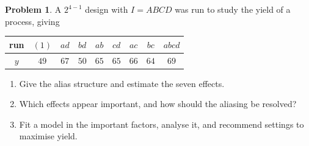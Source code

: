 \documentclass[11pt,a4paper]{article}
\numberwithin{equation}{section}
\theoremstyle{definition}
\newtheorem{problemx}{Problem}[subsection]
\newenvironment{problem}{\begin{problemx}}{\end{problemx}}
\begin{document}
\begin{problem}
A $2^{4-1}$ design with $I = ABCD$ was run to study the yield of a process, giving
\begin{center}
\begin{tabular}{c|cccccccc}
run & $(1)$ & $ad$ & $bd$ & $ab$ & $cd$ & $ac$ & $bc$ & $abcd$ \\
\hline
$y$ & $49$ & $67$ & $50$ & $65$ & $65$ & $66$ & $64$ & $69$
\end{tabular}
\end{center}
\begin{enumerate}[label=(\alph*)]
\item Give the alias structure and estimate the seven effects.
\item Which effects appear important, and how should the aliasing be resolved?
\item Fit a model in the important factors, analyse it, and recommend settings to maximise yield.
\end{enumerate}
\end{problem}
\end{document}
